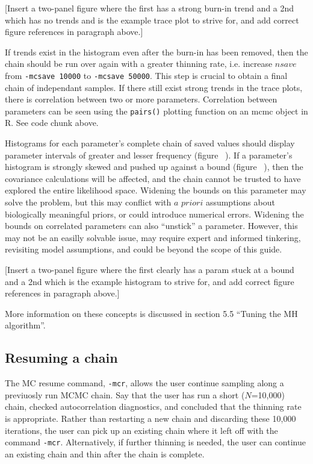 \documentclass{article}\usepackage[]{graphicx}\usepackage[]{color}
\begin{document}
[Insert a two-panel figure where the first has a strong burn-in trend and 
a 2nd which has no trends and is the example trace plot to strive for, and 
add correct figure references in paragraph above.]

If trends exist in the histogram even after the burn-in has been removed, 
then the chain should be run over again with a greater thinning rate, i.e. 
increase \texttt{$nsave$} from \texttt{-mcsave 10000} to \texttt{-mcsave 50000}. 
This step is crucial to obtain a final chain of independant samples. If there 
still exist strong trends in the trace plots, there is correlation between 
two or more parameters. Correlation between parameters can be seen using the 
\texttt{pairs()} plotting function on an mcmc object in R. See code chunk above.

Histograms for each parameter's complete chain of saved values should display 
parameter intervals of greater and lesser frequency (figure ~). If a parameter's
histogram is strongly skewed and pushed up against a bound (figure ~), then the 
covariance calculations will be affected, and the chain cannot be trusted to 
have explored the entire likelihood space. Widening the bounds on this parameter 
may solve the problem, but this may conflict with $a$ $priori$ assumptions about 
biologically meaningful priors, or could introduce numerical errors. Widening 
the bounds on correlated parameters can also ``unstick'' a parameter. However, 
this may not be an easilly solvable issue, may require expert and informed 
tinkering, revisiting model assumptions, and could be beyond the scope of this 
guide.

[Insert a two-panel figure where the first clearly has a param stuck at a 
bound and a 2nd which is the example histogram to strive for, and add correct 
figure references in paragraph above.]

More information on these concepts is discussed in section 5.5 ``Tuning the 
MH algorithm''.

\subsection{Resuming a chain}\label{sec:restart}
The MC resume command, \texttt{-mcr}, allows the user continue sampling along 
a previuosly run MCMC chain. Say that the user has run a short ($N$=10,000) chain, 
checked autocorrelation diagnostics, and concluded that the thinning rate is
appropriate. Rather than restarting a new chain and discarding these 10,000 
iterations, the user can pick up an existing chain where it left off with the 
command \texttt{-mcr}. Alternatively, if further thinning is needed, the user
can continue an existing chain and thin after the chain is complete. 
\end{document}
